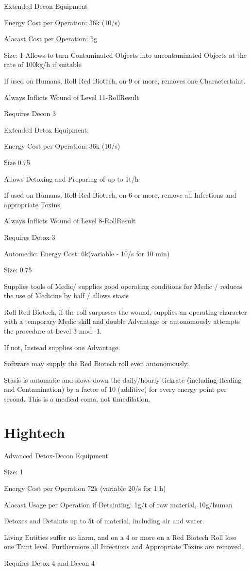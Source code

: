 Extended Decon Equipment\par
Energy Cost per Operation: 36k (10/s)\par
Alacast Cost per Operation: 5g\par
Size: 1
Allows to turn Contaminated Objects into uncontaminated Objects at the rate of 100kg/h if suitable\par
If used on Humans, Roll Red Biotech, on 9 or more, removes one Charactertaint.\par
Always Inflicts Wound of Level 11-RollResult\par
Requires Decon 3\par

Extended Detox Equipment:\par
Energy Cost per Operation: 36k (10/s)\par
Size 0.75\par
Allows Detoxing and Preparing of up to 1t/h\par
If used on Humans, Roll Red Biotech, on 6 or more, remove all Infections and appropriate Toxins.\par
Always Inflicts Wound of Level 8-RollResult\par
Requires Detox 3\par
Automedic:
Energy Cost: 6k(variable - 10/s for 10 min)\par
Size: 0.75\par
Supplies tools of Medic/ supplies good operating conditions for Medic / reduces the use of Medicine by half / allows stasis\par
Roll Red Biotech, if the roll surpasses the wound, supplies an operating character with a temporary Medic skill and
double Advantage or autonomously attempts the procedure at Level 3 mod -1.\par
If not, Instead supplies one Advantage.\par
Software may supply the Red Biotech roll even autonomously.\par
Stasis is automatic and slows down the daily/hourly tickrate (including Healing and Contamination) by a factor of 10
(additive) for every energy point per second.
This is a medical coma, not timedilation.
\section{Hightech}\label{sec:hightech}
Advanced Detox-Decon Equipment \par
Size: 1\par
Energy Cost per Operation 72k (variable 20/s for 1 h)\par
Alacast Usage per Operation if Detainting: 1g/t of raw material, 10g/human\par
Detoxes and Detaints up to 5t of material, including air and water.\par
Living Entities suffer no harm, and on a 4 or more on a Red Biotech Roll lose one Taint level.
Furthermore all Infections and Appropriate Toxins are removed.\par
Requires Detox 4 and Decon 4

